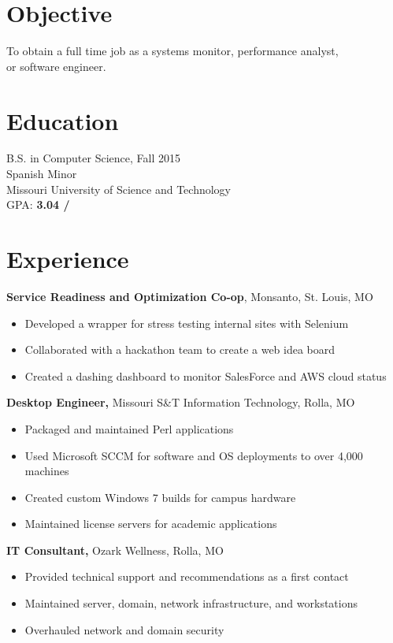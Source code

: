 \documentclass[margin]{res}
\begin{document}
  \begin{resume} 
   
    \section{Objective} 
    To obtain a full time job as a systems monitor, performance analyst, \\ or software engineer.

    \section{Education} 
      B.S. in Computer Science, Fall 2015 \\
      Spanish Minor \\
      Missouri University of Science and Technology \\
      GPA: {\bf 3.04 \slash {}}

    \section{Experience}
    {\bf Service Readiness and Optimization Co-op}, Monsanto, St. Louis, MO%
       \begin{itemize} \itemsep -1pt  %
         \item Developed a wrapper for stress testing internal sites with Selenium
         \item Collaborated with a hackathon team to create a web idea board 
         \item Created a dashing dashboard to monitor SalesForce and AWS cloud status
       \end{itemize}
     {\bf Desktop Engineer,} Missouri S\&T Information Technology, Rolla, MO%
       \begin{itemize} \itemsep -1pt  %
         \item Packaged and maintained Perl applications
         \item Used Microsoft SCCM for software and OS deployments to over 4,000 machines
         \item Created custom Windows 7 builds for campus hardware
         \item Maintained license servers for academic applications
       \end{itemize}

     {\bf IT Consultant,} Ozark Wellness, Rolla, MO%
       \begin{itemize} \itemsep -1pt  %
         \item Provided technical support and recommendations as a first contact
         \item Maintained server, domain, network infrastructure, and workstations
         \item Overhauled network and domain security
       \end{itemize}


\end{resume}
\end{document}
